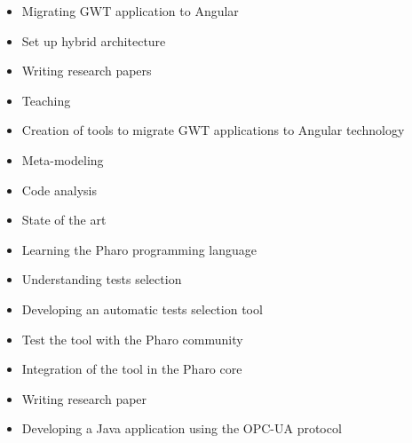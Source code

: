 \documentclass[10pt,a4paper,ragged2e,withhyper]{altacv}
\begin{document}
\begin{paracol}{2}


\begin{itemize}
  \item Migrating GWT application to Angular
  \item Set up hybrid architecture
  \item Writing research papers
  \item Teaching
\end{itemize}

\divider


\begin{itemize}
  \item Creation of tools to migrate GWT applications to Angular technology
  \item Meta-modeling
  \item Code analysis
  \item State of the art
\end{itemize}

\divider


\begin{itemize}
  \item Learning the Pharo programming language
  \item Understanding tests selection
  \item Developing an automatic tests selection tool
  \item Test the tool with the Pharo community
  \item Integration of the tool in the Pharo core
  \item Writing research paper
\end{itemize}

\divider


\begin{itemize}
  \item Developing a Java application using the OPC-UA protocol
\end{itemize}



\end{paracol}
\end{document}
